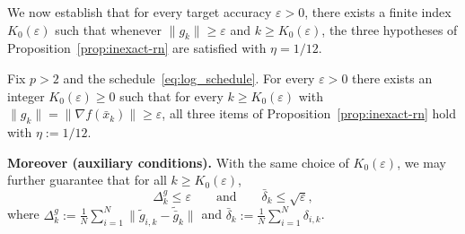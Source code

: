 \documentclass[review,onefignum,onetabnum]{siamart171218}
\begin{document}
We now establish that for every target accuracy $\varepsilon>0$, there
exists a finite index $K_0(\varepsilon)$ such that whenever
$\|g_k\|\ge\varepsilon$ and $k\ge K_0(\varepsilon)$,
the three hypotheses of Proposition~\ref{prop:inexact-rn} are
satisfied with $\eta=1/12$.
\begin{proposition}\label{prop:burnin}
Fix $p>2$ and the schedule~\eqref{eq:log_schedule}.
For every $\varepsilon>0$ there exists an integer $K_0(\varepsilon)\ge0$ such that
for every $k\ge K_0(\varepsilon)$ with $\|g_k\|=\|\nabla f(\bar x_k)\|\ge \varepsilon$,
all three items of Proposition~\ref{prop:inexact-rn} hold with $\eta:=1/12$.

\smallskip
\noindent\textbf{Moreover (auxiliary conditions).}
With the same choice of $K_0(\varepsilon)$, we may further guarantee that for all $k\ge K_0(\varepsilon)$,
\begin{equation}\label{eq:burnin_aux_enforce}
\Delta_k^g \le \varepsilon
\qquad\text{and}\qquad
\bar\delta_k \le \sqrt{\varepsilon},
\end{equation}
where $\Delta_k^g:=\frac1N\sum_{i=1}^N\|\tilde g_{i,k}-\tilde{\bar g}_k\|$ and $\bar\delta_k:=\frac1N\sum_{i=1}^N\delta_{i,k}$.
\end{proposition}
\end{document}
